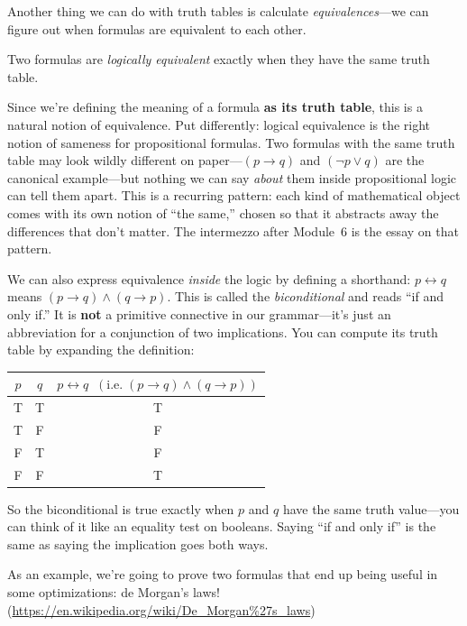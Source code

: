 \documentclass[11pt]{article}
\begin{document}
Another thing we can do with truth tables is calculate \emph{equivalences}---we can figure out when formulas are equivalent to each other.

\begin{definition}
Two formulas are \emph{logically equivalent} exactly when they have the same truth table.
\end{definition}

Since we're defining the meaning of a formula \textbf{as its truth table}, this is a natural notion of equivalence. Put differently: logical equivalence is the right notion of sameness for propositional formulas. Two formulas with the same truth table may look wildly different on paper---$(p \to q)$ and $(\lnot p \vee q)$ are the canonical example---but nothing we can say \emph{about} them inside propositional logic can tell them apart. This is a recurring pattern: each kind of mathematical object comes with its own notion of ``the same,'' chosen so that it abstracts away the differences that don't matter. The intermezzo after Module~6 is the essay on that pattern.

We can also express equivalence \emph{inside} the logic by defining a shorthand: $p \leftrightarrow q$ means $(p \to q) \wedge (q \to p)$. This is called the \emph{biconditional} and reads ``if and only if.'' It is \textbf{not} a primitive connective in our grammar---it's just an abbreviation for a conjunction of two implications. You can compute its truth table by expanding the definition:

\begin{center}
\begin{tabular}{cc|c}
\toprule
$p$ & $q$ & $p \leftrightarrow q \;\;(\text{i.e.}\; (p \to q) \wedge (q \to p))$ \\
\midrule
T & T & T \\
T & F & F \\
F & T & F \\
F & F & T \\
\bottomrule
\end{tabular}
\end{center}

So the biconditional is true exactly when $p$ and $q$ have the same truth value---you can think of it like an equality test on booleans. Saying ``if and only if'' is the same as saying the implication goes both ways.

As an example, we're going to prove two formulas that end up being useful in some optimizations: de Morgan's laws! (\url{https://en.wikipedia.org/wiki/De_Morgan%27s_laws})
\end{document}
